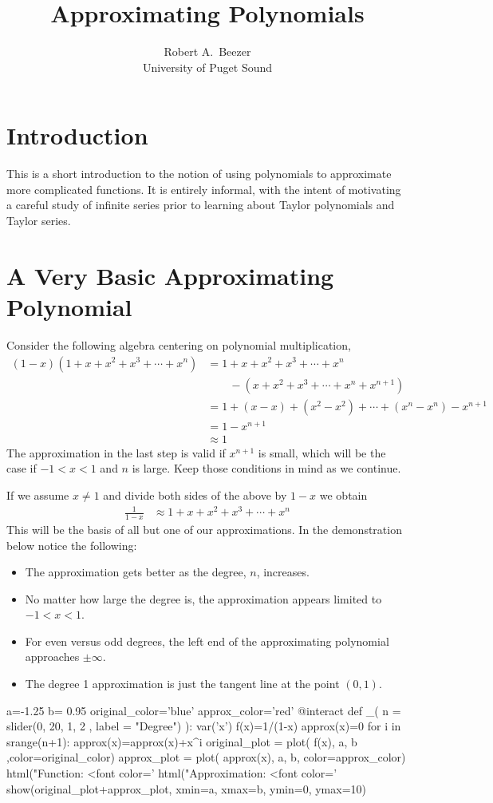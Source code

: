 \documentclass[12pt]{article}
\title{Approximating Polynomials}
\author{Robert A.\ Beezer\\University of Puget Sound}
\begin{document}
%
\maketitle
%
\section*{Introduction}
%
This is a short introduction to the notion of using polynomials to approximate more complicated functions.  It is entirely informal, with the intent of motivating a careful study of infinite series prior to learning about Taylor polynomials and Taylor series.
%
\section{A Very Basic Approximating Polynomial}
%
Consider the following algebra centering on polynomial multiplication,
%
\begin{align*}
(1-x)(1+x+x^2+x^3+\cdots+x^n)
&=1+x+x^2+x^3+\cdots+x^n\\
&\quad\quad-(x+x^2+x^3+\cdots+x^n+x^{n+1})\\
&=1+(x-x)+(x^2-x^2)+\cdots+(x^n-x^n)-x^{n+1}\\
&=1-x^{n+1}\\
&\approx 1
\end{align*}
%
The approximation in the last step is valid if $x^{n+1}$ is small, which will be the case if $-1<x<1$ and $n$ is large.  Keep those conditions in mind as we continue.\par
%
If we assume $x\neq 1$ and divide both sides of the above by $1-x$ we obtain
%
\begin{align}
\frac{1}{1-x}&\approx 1+x+x^2+x^3+\cdots+x^n\label{geometric}
\end{align}
%
This will be the basis of all but one of our approximations.  In the demonstration below notice the following:
%
\begin{itemize}
\item The approximation gets better as the degree, $n$, increases.
\item No matter how large the degree is, the approximation appears limited to $-1<x<1$.
\item For even versus odd degrees, the left end of the approximating polynomial approaches $\pm\infty$.
\item The degree 1 approximation is just the tangent line at the point $(0,1)$.
\end{itemize}
%
\par
%
\begin{sageverbatim}
a=-1.25
b= 0.95
original_color='blue'
approx_color='red'
@interact
def _( n = slider(0, 20, 1, 2 , label = "Degree") ):
    var('x')
    f(x)=1/(1-x)
    approx(x)=0
    for i in srange(n+1):
        approx(x)=approx(x)+x^i
    original_plot = plot( f(x), a, b ,color=original_color)
    approx_plot = plot( approx(x),  a, b, color=approx_color)
    html("Function: <font color='%
    html("Approximation: <font color='%
    show(original_plot+approx_plot, xmin=a, xmax=b, ymin=0, ymax=10)
\end{sageverbatim}
%
%
\end{document}
